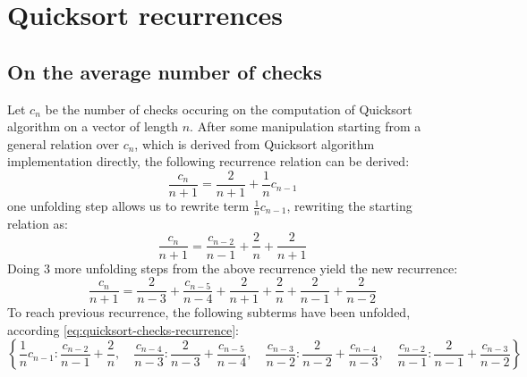 
\chapter{Quicksort recurrences}

\section{On the average number of checks}

Let $c_{n}$ be the number of checks occuring on the computation
of Quicksort algorithm on a vector of length $n$. After some manipulation
starting from a general relation over $c_{n}$, which is derived from
Quicksort algorithm implementation directly, the following
recurrence relation can be derived:
\begin{equation}
    \label{eq:quicksort-checks-recurrence}
    \frac{c_{n}}{n + 1} = \frac{2}{n + 1} + \frac{1}{n} c_{n - 1}
\end{equation}
one unfolding step allows us to rewrite term $\frac{1}{n} c_{n - 1}$, 
rewriting the starting relation as:
\begin{displaymath}
    \frac{c_{n}}{n + 1} = \frac{c_{n - 2}}{n - 1} + \frac{2}{n} + \frac{2}{n + 1}
\end{displaymath}
Doing $3$ more unfolding steps from the above recurrence yield the
new recurrence:
\begin{displaymath}
    \frac{c_{n}}{n + 1} = \frac{2}{n - 3} + \frac{c_{n - 5}}{n - 4} + \frac{2}{n + 1} + \frac{2}{n} + \frac{2}{n - 1} + \frac{2}{n - 2}
\end{displaymath}
To reach previous recurrence, the following subterms have been unfolded,
according \autoref{eq:quicksort-checks-recurrence}:
\begin{displaymath}
    \left \{ \frac{1}{n} c_{n - 1} : \frac{c_{n - 2}}{n - 1} + \frac{2}{n}, \quad \frac{c_{n - 4}}{n - 3} : \frac{2}{n - 3} + \frac{c_{n - 5}}{n - 4}, \quad \frac{c_{n - 3}}{n - 2} : \frac{2}{n - 2} + \frac{c_{n - 4}}{n - 3}, \quad \frac{c_{n - 2}}{n - 1} : \frac{2}{n - 1} + \frac{c_{n - 3}}{n - 2}\right \}
\end{displaymath}


